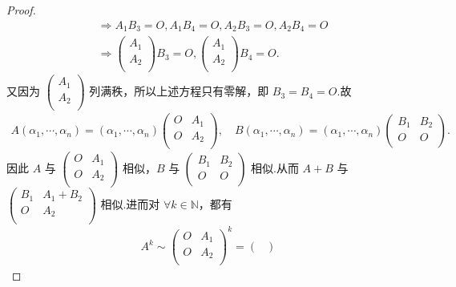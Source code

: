 \documentclass[../../main.tex]{subfiles}%
\begin{document}
\begin{proof}
\begin{align*}
&\Longrightarrow A_1B_3=O,A_1B_4=O,A_2B_3=O,A_2B_4=O
\\
&\Longrightarrow \begin{pmatrix}
A_1\\
A_2\\
\end{pmatrix} B_3=O,\begin{pmatrix}
A_1\\
A_2\\
\end{pmatrix} B_4=O.
\end{align*}
又因为 $\begin{pmatrix}
A_1\\
A_2\\
\end{pmatrix}$ 列满秩，所以上述方程只有零解，即 $B_3=B_4=O$.故
\begin{align*}
A\left( \alpha _1,\cdots ,\alpha _n \right) =\left( \alpha _1,\cdots ,\alpha _n \right) \begin{pmatrix}
O&		A_1\\
O&		A_2\\
\end{pmatrix}, \quad B\left( \alpha _1,\cdots ,\alpha _n \right) =\left( \alpha _1,\cdots ,\alpha _n \right) \begin{pmatrix}
B_1&		B_2\\
O&		O\\
\end{pmatrix}.
\end{align*}
因此 $A$ 与 $\begin{pmatrix}
O&		A_1\\
O&		A_2\\
\end{pmatrix}$ 相似，$B$ 与 $\begin{pmatrix}
B_1&		B_2\\
O&		O\\
\end{pmatrix}$ 相似.从而 $A+B$ 与 $\begin{pmatrix}
B_1&		A_1+B_2\\
O&		A_2\\
\end{pmatrix}$ 相似.进而对 $\forall k\in \mathbb{N}$，都有
\begin{align*}
A^k\sim \begin{pmatrix}
O&		A_1\\
O&		A_2\\
\end{pmatrix} ^k=\begin{pmatrix}

\end{pmatrix}
\end{align*}
\end{proof}
\end{document}
